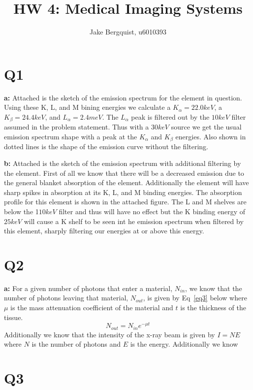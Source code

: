 \documentclass[12pt]{article}
\begin{document}
\title{HW 4: Medical Imaging Systems}
\author{Jake Bergquist, u6010393 }
\maketitle

\section{Q1}
\noindent\textbf{a: } Attached is the sketch of the emission spectrum for the element in question. Using these K, L, and M bining energies we calculate a $K_\alpha = 22.0 keV$, a $K_\beta = 24.4 keV$, and $L_\alpha = 2.4 meV$. The $L_\alpha$ peak is filtered out by the $10 keV$ filter assumed in the problem statement. Thus with a $30 keV$ source we get the usual emission spectrum shape with a peak at the $K_\alpha$ and $K_\beta$ energies. Also shown in dotted lines is the shape of the emission curve without the filtering.

\noindent\textbf{b: } Attached is the sketch of the emission spectrum with additional filtering by the element. First of all we know that there will be a decreased emission due to the general blanket absorption of the element. Additionally the element will have sharp spikes in absorption at its K, L, and M binding energies. The absorption profile for this element is shown in the attached figure. The L and M shelves are below the 1$10keV$ filter and thus will have no effect but the K binding energy of $25 keV$ will cause a K shelf to be seen int he emission spectrum when filtered by this element, sharply filtering our energies at or above this energy.

\section{Q2}
\noindent\textbf{a: } 
For a given number of photons that enter a material, $N_{in}$, we know that the number of photons leaving that material, $N_{out}$, is given by Eq~\ref{eq3} below where $\mu$ is the mass attenuation coefficient of the material and $t$ is the thickness of the tissue.
 \begin{equation}
 N_{out} = N_{in}e^{-\mu t}
 \label{eq3}
 \end{equation}
\noindentNow Additionally we know that the intensity of the x-ray beam is given by $I = NE$ where $N$ is the number of photons and $E$ is the energy. Additionally we know 


\section{Q3}
\end{document}
